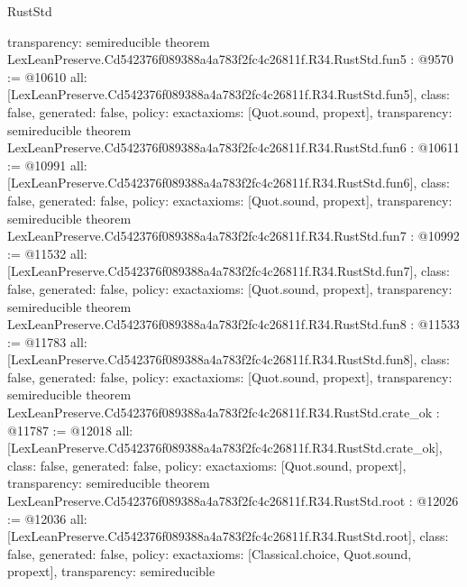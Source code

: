 \begin{lexlean}{RustStd}
\begin{coremodule}
{  transparency: semireducible
}
theorem LexLeanPreserve.Cd542376f089388a4a783f2fc4c26811f.R34.RustStd.fun5 : @9570 := @10610 {
  all: [LexLeanPreserve.Cd542376f089388a4a783f2fc4c26811f.R34.RustStd.fun5],
  class: false,
  generated: false,
  policy: exact{axioms: [Quot.sound, propext]},
  transparency: semireducible
}
theorem LexLeanPreserve.Cd542376f089388a4a783f2fc4c26811f.R34.RustStd.fun6 : @10611 := @10991 {
  all: [LexLeanPreserve.Cd542376f089388a4a783f2fc4c26811f.R34.RustStd.fun6],
  class: false,
  generated: false,
  policy: exact{axioms: [Quot.sound, propext]},
  transparency: semireducible
}
theorem LexLeanPreserve.Cd542376f089388a4a783f2fc4c26811f.R34.RustStd.fun7 : @10992 := @11532 {
  all: [LexLeanPreserve.Cd542376f089388a4a783f2fc4c26811f.R34.RustStd.fun7],
  class: false,
  generated: false,
  policy: exact{axioms: [Quot.sound, propext]},
  transparency: semireducible
}
theorem LexLeanPreserve.Cd542376f089388a4a783f2fc4c26811f.R34.RustStd.fun8 : @11533 := @11783 {
  all: [LexLeanPreserve.Cd542376f089388a4a783f2fc4c26811f.R34.RustStd.fun8],
  class: false,
  generated: false,
  policy: exact{axioms: [Quot.sound, propext]},
  transparency: semireducible
}
theorem LexLeanPreserve.Cd542376f089388a4a783f2fc4c26811f.R34.RustStd.crate_ok : @11787 := @12018 {
  all: [LexLeanPreserve.Cd542376f089388a4a783f2fc4c26811f.R34.RustStd.crate_ok],
  class: false,
  generated: false,
  policy: exact{axioms: [Quot.sound, propext]},
  transparency: semireducible
}
theorem LexLeanPreserve.Cd542376f089388a4a783f2fc4c26811f.R34.RustStd.root : @12026 := @12036 {
  all: [LexLeanPreserve.Cd542376f089388a4a783f2fc4c26811f.R34.RustStd.root],
  class: false,
  generated: false,
  policy: exact{axioms: [Classical.choice, Quot.sound, propext]},
  transparency: semireducible
}


\end{coremodule}
\end{lexlean}
